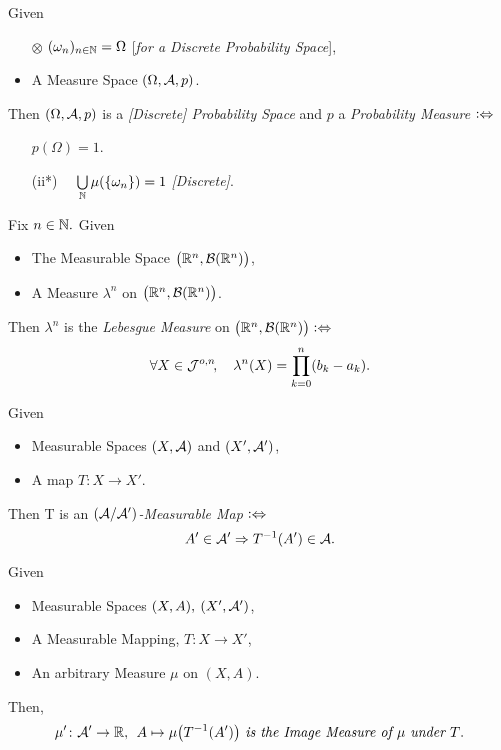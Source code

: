 \begin{definition}
Given
\begin{itemize}
\item[\tiny$\otimes$]
	$(\omega_n)_{n \in \mathbb{N}} = \Omega$ [\emph{for a Discrete Probability Space}],
\item
 	A Measure Space $(\Omega, \mathcal{A}, p)$.
\end{itemize}
Then $(\Omega, \mathcal{A}, p)$ is a \emph{[Discrete] Probability Space} and $p$ a \emph{Probability Measure} $\mathrel{\vcentcolon\Leftrightarrow}$
\begin{itemize}
\centering
\item[]
	$p(\Omega) = 1$.
\item[]
	(ii*) \ \ $\bigcup\limits_{\mathbb{N}} \mu(\{\omega_n\}) = 1$ \emph{[Discrete]}.
\end{itemize}
\end{definition}

\begin{definition}
Fix $n \in \mathbb{N}.$ Given 
\begin{itemize}
\item
	The Measurable Space $\bigl(\mathbb{R}^n, \mathcal{B}(\mathbb{R}^n)\bigr)$,
\item
	A Measure $\lambda^n$ on $\bigl(\mathbb{R}^n, \mathcal{B}(\mathbb{R}^n)\bigr)$.
\end{itemize}
Then $\lambda^n$ is the \emph{Lebesgue Measure} on $\bigl(\mathbb{R}^n, \mathcal{B}(\mathbb{R}^n)\bigr) \mathrel{\vcentcolon\Leftrightarrow}$ 
$$\forall X \in \mathcal{J}^{o,n}\!, \quad \lambda^n(X) = \prod_{k=0}^n(b_k - a_k).$$
\end{definition}

\begin{definition}
Given
\begin{itemize}
\item
	Measurable Spaces $(X, \mathcal{A})$ and $(X', \mathcal{A}')$,
\item
	A map $T\colon X \rightarrow X'$.
\end{itemize}
Then T is an \emph{$(\mathcal{A}/\mathcal{A}')$-Measurable Map} $\mathrel{\vcentcolon\Leftrightarrow}$
$$ A' \in \mathcal{A}' \Rightarrow T^{-1}(A') \in \mathcal{A}.$$
\end{definition}

\begin{definition}
Given
\begin{itemize}
\item
	Measurable Spaces $(X, A), \> (X', \mathcal{A}')$,
\item
	A Measurable Mapping, $T\colon X \rightarrow X'$,
\item
	An arbitrary Measure $\mu$ on $(X, A)$.
\end{itemize}
Then,
$$\mu'\colon \mathcal{A}' \rightarrow \mathbb{R}, \>\> A \mapsto \mu\bigl(T^{-1}(A')\bigr) \text{\it\ is the Image Measure of $\mu$ under $T$}.$$
\end{definition}

